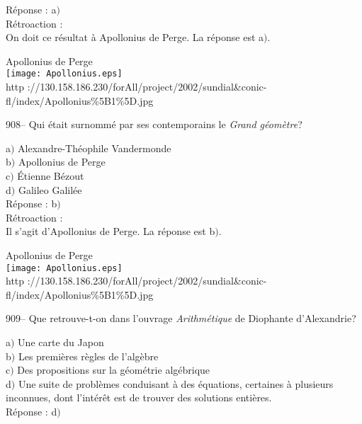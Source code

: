 ﻿\documentclass[letterpaper, 12pt]{article}
\begin{document}
R\'eponse : a$)$\\

R\'etroaction : \\
On doit ce r\'esultat \`a Apollonius de Perge. La r\'eponse est a$)$.\\

        \begin{center}
        Apollonius de Perge\\
    \texttt{[image: Apollonius.eps]}\\
        {\footnotesize http
://130.158.186.230/forAll/project/2002/sundial\&conic-fl/index/Apollonius\%5B1\%5D.jpg}
    \end{center}

908-- Qui \'etait surnomm\'e par ses contemporains le {\sl Grand
g\'eom\`etre}?

a$)$ Alexandre-Th\'eophile Vandermonde \\
b$)$ Apollonius de Perge \\
c$)$ \'Etienne B\'ezout \\
d$)$ Galileo Galil\'ee \\

R\'eponse : b$)$\\

R\'etroaction : \\
Il s'agit d'Apollonius de Perge. La r\'eponse est b$)$.\\

        \begin{center}
        Apollonius de Perge\\
    \texttt{[image: Apollonius.eps]}\\
        {\footnotesize http
://130.158.186.230/forAll/project/2002/sundial\&conic-fl/index/Apollonius\%5B1\%5D.jpg}
    \end{center}

909-- Que retrouve-t-on dans l'ouvrage {\sl Arithm\'etique} de
Diophante d'Alexandrie?

a$)$ Une carte du Japon \\
b$)$ Les premi\`eres r\`egles de l'alg\`ebre \\
c$)$ Des propositions sur la g\'eom\'etrie alg\'ebrique \\
d$)$ Une suite de probl\`emes conduisant \`a des \'equations, certaines \`a
plusieurs inconnues,
dont l'int\'er\^et est de trouver des solutions enti\`eres.\\

R\'eponse : d$)$\\
\end{document}
